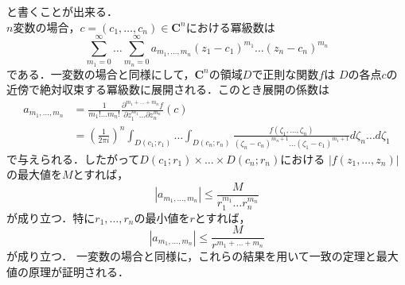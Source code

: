 と書くことが出来る．\\
$n$変数の場合，$c = (c_{1},\dots,c_{n}) \in \mathbf{C}^{n}$における冪級数は
\begin{equation}
  \sum_{m_{1} = 0}^{\infty}\dots \sum_{m_{n} = 0}^{\infty}a_{m_{1},\dots,m_{n}}(z_{1} - c_{1})^{m_{1}}\dots (z_{n} - c_{n})^{m_{n}}
\end{equation}
である．一変数の場合と同様にして，$\mathbf{C}^{n}$の領域$D$で正則な関数$f$は
$D$の各点$c$の近傍で絶対収束する冪級数に展開される．このとき展開の係数は
\begin{align}
  a_{m_{1},\dots,m_{n}} 
  &= \frac{1}{m_{1}!\dots m_{n}!}\frac{\partial^{m_{1} + \dots + m_{n}}f}{\partial z_{1}^{m_{1}}\dots \partial z_{n}^{m_{n}}}(c)\\
  &= \left(\frac{1}{2\pi i}\right)^{n}\int_{D(c_{1};r_{1})}\dots \int_{D(c_{n};r_{n})}\frac{f(\zeta_{1},\dots,\zeta_{n})}{(\zeta_{n} - c_{n})^{m_{n} + 1}\dots (\zeta_{1} - c_{1})^{m_{1} + 1}}d\zeta_{n}\dots d\zeta_{1}
\end{align}
で与えられる．したがって$D(c_{1};r_{1})\times \dots \times D(c_{n};r_{n})$における
$|f(z_{1},\dots,z_{n})|$の最大値を$M$とすれば，
\begin{equation}
  |a_{m_{1},\dots,m_{n}}|\leq \frac{M}{r_{1}^{m_{1}}\dots r_{n}^{m_{n}}}
\end{equation}
が成り立つ．特に$r_{1},\dots,r_{n}$の最小値を$r$とすれば，
\begin{equation}
  |a_{m_{1},\dots,m_{n}}|\leq \frac{M}{r^{m_{1}+\dots + m_{n}}}
\end{equation}
が成り立つ．
一変数の場合と同様に，これらの結果を用いて一致の定理と最大値の原理が証明される．

